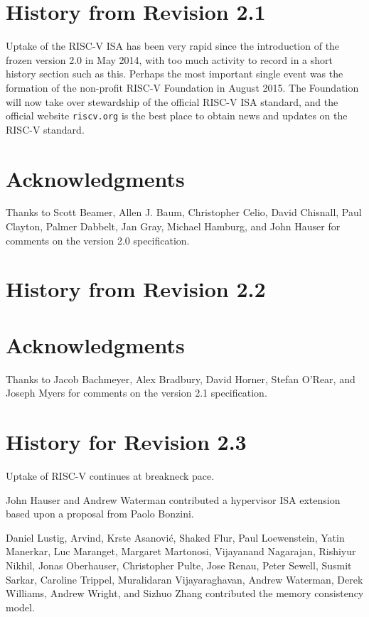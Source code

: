 \section{History from Revision 2.1}

Uptake of the RISC-V ISA has been very rapid since the introduction of
the frozen version 2.0 in May 2014, with too much activity to record
in a short history section such as this.  Perhaps the most important
single event was the formation of the non-profit RISC-V Foundation in
August 2015. The Foundation will now take over stewardship of the
official RISC-V ISA standard, and the official website {\tt riscv.org}
is the best place to obtain news and updates on the RISC-V standard.

\section*{Acknowledgments}

Thanks to Scott Beamer, Allen J. Baum, Christopher Celio, David Chisnall,
Paul Clayton, Palmer Dabbelt, Jan Gray, Michael Hamburg, and John
Hauser for comments on the version 2.0 specification.

\section{History from Revision 2.2}


\section*{Acknowledgments}

Thanks to Jacob Bachmeyer, Alex Bradbury, David Horner, Stefan O'Rear,
and Joseph Myers for comments on the version 2.1 specification.

\section{History for Revision 2.3}

Uptake of RISC-V continues at breakneck pace.

John Hauser and Andrew Waterman contributed a hypervisor ISA extension
based upon a proposal from Paolo Bonzini.

Daniel Lustig, Arvind, Krste Asanovi\'{c}, Shaked Flur, Paul Loewenstein, Yatin
Manerkar, Luc Maranget, Margaret Martonosi, Vijayanand Nagarajan, Rishiyur
Nikhil, Jonas Oberhauser, Christopher Pulte, Jose Renau, Peter Sewell, Susmit
Sarkar, Caroline Trippel, Muralidaran Vijayaraghavan, Andrew Waterman, Derek
Williams, Andrew Wright, and Sizhuo Zhang contributed the memory consistency
model.

